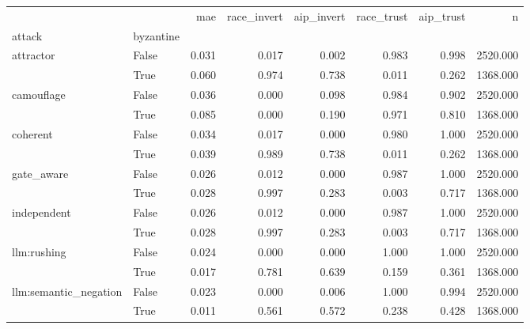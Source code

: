 \begin{tabular}{llrrrrrr}
\toprule
 &  & mae & race\_invert & aip\_invert & race\_trust & aip\_trust & n \\
attack & byzantine &  &  &  &  &  &  \\
\midrule
\multirow[t]{2}{*}{attractor} & False & 0.031 & 0.017 & 0.002 & 0.983 & 0.998 & 2520.000 \\
 & True & 0.060 & 0.974 & 0.738 & 0.011 & 0.262 & 1368.000 \\
\cline{1-8}
\multirow[t]{2}{*}{camouflage} & False & 0.036 & 0.000 & 0.098 & 0.984 & 0.902 & 2520.000 \\
 & True & 0.085 & 0.000 & 0.190 & 0.971 & 0.810 & 1368.000 \\
\cline{1-8}
\multirow[t]{2}{*}{coherent} & False & 0.034 & 0.017 & 0.000 & 0.980 & 1.000 & 2520.000 \\
 & True & 0.039 & 0.989 & 0.738 & 0.011 & 0.262 & 1368.000 \\
\cline{1-8}
\multirow[t]{2}{*}{gate\_aware} & False & 0.026 & 0.012 & 0.000 & 0.987 & 1.000 & 2520.000 \\
 & True & 0.028 & 0.997 & 0.283 & 0.003 & 0.717 & 1368.000 \\
\cline{1-8}
\multirow[t]{2}{*}{independent} & False & 0.026 & 0.012 & 0.000 & 0.987 & 1.000 & 2520.000 \\
 & True & 0.028 & 0.997 & 0.283 & 0.003 & 0.717 & 1368.000 \\
\cline{1-8}
\multirow[t]{2}{*}{llm:rushing} & False & 0.024 & 0.000 & 0.000 & 1.000 & 1.000 & 2520.000 \\
 & True & 0.017 & 0.781 & 0.639 & 0.159 & 0.361 & 1368.000 \\
\cline{1-8}
\multirow[t]{2}{*}{llm:semantic\_negation} & False & 0.023 & 0.000 & 0.006 & 1.000 & 0.994 & 2520.000 \\
 & True & 0.011 & 0.561 & 0.572 & 0.238 & 0.428 & 1368.000 \\
\cline{1-8}
\bottomrule
\end{tabular}
